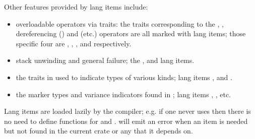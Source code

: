 \blank

Other features provided by lang items include:

\begin{itemize}
  \item{overloadable operators via traits: the traits corresponding to the \code{==}, \code{<}, dereferencing (\code{*}) 
      and \code{+} (etc.) operators are all marked with lang items; those specific four are , , , 
      and  respectively.}
  \item{stack unwinding and general failure; the ,  and  lang items.}
  \item{the traits in  used to indicate types of various kinds; lang items ,  and .}
  \item{the marker types and variance indicators found in ; lang items , 
      , etc.}
\end{itemize}

Lang items are loaded lazily by the compiler; e.g. if one never uses  then there is no need to define functions 
for  and .  will emit an error when an item is needed but not found 
in the current crate or any that it depends on.
